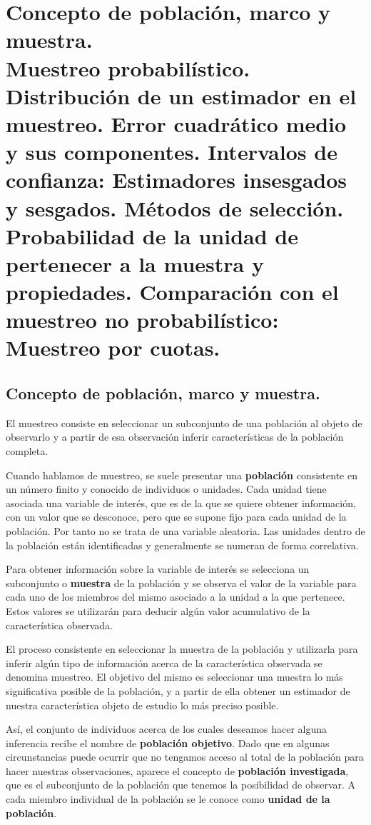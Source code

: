 
\chapter[Concepto de poblaci\'on, marco y muestra.]{Concepto de poblaci\'on, marco y muestra.\\
	\normalsize Muestreo probabil\'istico. Distribuci\'on de un estimador en el muestreo. Error cuadr\'atico medio y sus componentes. Intervalos de confianza: Estimadores insesgados y sesgados. M\'etodos de selecci\'on. Probabilidad de la unidad de pertenecer a la muestra y propiedades. Comparaci\'on con el muestreo no probabil\'istico: Muestreo por cuotas.}

\section{Concepto de poblaci\'on, marco y muestra.}

El muestreo consiste en seleccionar un subconjunto de una poblaci\'on al objeto de observarlo y a partir de esa observaci\'on inferir caracter\'isticas de la poblaci\'on completa. 

Cuando hablamos de muestreo, se suele presentar una \textbf{poblaci\'on} consistente en un n\'umero finito y conocido de individuos o unidades. Cada unidad tiene asociada una variable de inter\'es, que es de la que se quiere obtener informaci\'on, con un valor que se desconoce, pero que se supone fijo para cada unidad de la poblaci\'on. Por tanto no se trata de una variable aleatoria. Las unidades dentro de la poblaci\'on est\'an identificadas y generalmente se numeran de forma correlativa.

Para obtener informaci\'on sobre la variable de inter\'es se selecciona un subconjunto o \textbf{muestra} de la poblaci\'on y se observa el valor de la variable para cada uno de los miembros del mismo asociado a la unidad a la que pertenece. Estos valores se utilizar\'an para deducir alg\'un valor acumulativo de la caracter\'istica observada.

El proceso consistente en seleccionar la muestra de la poblaci\'on y utilizarla para inferir alg\'un tipo de informaci\'on acerca de la caracter\'istica observada se denomina muestreo. El objetivo del mismo es seleccionar una muestra lo m\'as significativa posible de la poblaci\'on, y a partir de ella obtener un estimador de nuestra caracter\'istica objeto de estudio lo m\'as preciso posible.

As\'i, el conjunto de individuos acerca de los cuales deseamos hacer alguna inferencia recibe el nombre de \textbf{poblaci\'on objetivo}. Dado que en algunas circunstancias puede ocurrir que no tengamos acceso al total de la poblaci\'on para hacer nuestras observaciones, aparece el concepto de \textbf{poblaci\'on investigada}, que es el subconjunto de la poblaci\'on que tenemos la posibilidad de observar. A cada miembro individual de la poblaci\'on se le conoce como \textbf{unidad de la poblaci\'on}.

